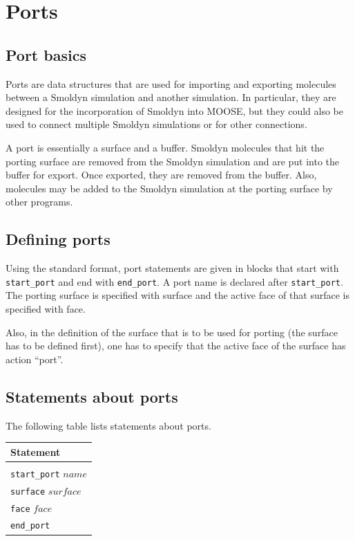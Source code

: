 \documentclass {scrbook}
\newcommand {\ttt} {\texttt}
\begin{document}
\chapter{Ports}

\section{Port basics}

Ports are data structures that are used for importing and exporting molecules between a Smoldyn simulation and another simulation. In particular, they are designed for the incorporation of Smoldyn into MOOSE, but they could also be used to connect multiple Smoldyn simulations or for other connections.

A port is essentially a surface and a buffer. Smoldyn molecules that hit the porting surface are removed from the Smoldyn simulation and are put into the buffer for export. Once exported, they are removed from the buffer. Also, molecules may be added to the Smoldyn simulation at the porting surface by other programs.

\section{Defining ports}

Using the standard format, port statements are given in blocks that start with \ttt{start\_port} and end with \ttt{end\_port}. A port name is declared after \ttt{start\_port}. The porting surface is specified with surface and the active face of that surface is specified with face.

Also, in the definition of the surface that is to be used for porting (the surface has to be defined first), one has to specify that the active face of the surface has action ``port''.

\section{Statements about ports}

The following table lists statements about ports.

\begin{longtable}[c]{l}
Statement\\
\hline \\
\ttt{start\_port} $name$\\
\ttt{surface} $surface$\\
\ttt{face} $face$\\
\ttt{end\_port}
\end{longtable}
\end{document}
